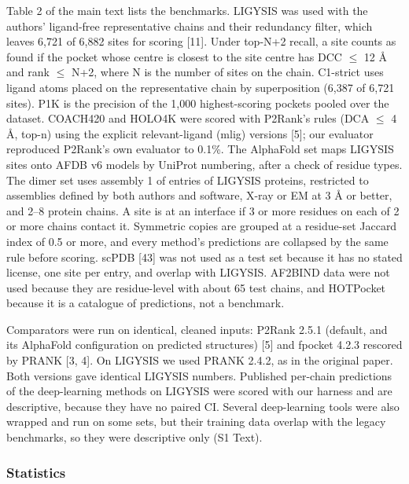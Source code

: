 \documentclass[10pt,letterpaper]{article}
\begin{document}
Table 2 of the main text lists the benchmarks. LIGYSIS was used with the authors' ligand-free representative chains and their redundancy filter, which leaves 6,721 of 6,882 sites for scoring [11]. Under top-N+2 recall, a site counts as found if the pocket whose centre is closest to the site centre has DCC $\le$ 12 \AA{} and rank $\le$ N+2, where N is the number of sites on the chain. C1-strict uses ligand atoms placed on the representative chain by superposition (6,387 of 6,721 sites). P1K is the precision of the 1,000 highest-scoring pockets pooled over the dataset. COACH420 and HOLO4K were scored with P2Rank's rules (DCA $\le$ 4 \AA{}, top-n) using the explicit relevant-ligand (mlig) versions [5]; our evaluator reproduced P2Rank's own evaluator to 0.1\%. The AlphaFold set maps LIGYSIS sites onto AFDB v6 models by UniProt numbering, after a check of residue types. The dimer set uses assembly 1 of entries of LIGYSIS proteins, restricted to assemblies defined by both authors and software, X-ray or EM at 3 \AA{} or better, and 2--8 protein chains. A site is at an interface if 3 or more residues on each of 2 or more chains contact it. Symmetric copies are grouped at a residue-set Jaccard index of 0.5 or more, and every method's predictions are collapsed by the same rule before scoring. scPDB [43] was not used as a test set because it has no stated license, one site per entry, and overlap with LIGYSIS. AF2BIND data were not used because they are residue-level with about 65 test chains, and HOTPocket because it is a catalogue of predictions, not a benchmark.

Comparators were run on identical, cleaned inputs: P2Rank 2.5.1 (default, and its AlphaFold configuration on predicted structures) [5] and fpocket 4.2.3 rescored by PRANK [3, 4]. On LIGYSIS we used PRANK 2.4.2, as in the original paper. Both versions gave identical LIGYSIS numbers. Published per-chain predictions of the deep-learning methods on LIGYSIS were scored with our harness and are descriptive, because they have no paired CI. Several deep-learning tools were also wrapped and run on some sets, but their training data overlap with the legacy benchmarks, so they were descriptive only (S1 Text).

\subsubsection*{Statistics}
\end{document}

